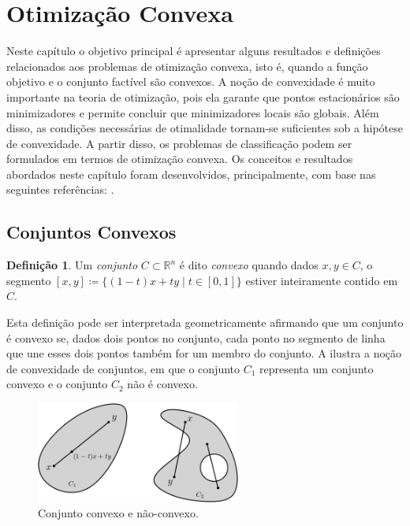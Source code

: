 \documentclass[12pt,a4paper]{scrartcl}
\def\RR{\mathds{R}}
\theoremstyle{definition}%
\newtheorem{defi}{Definição}
\begin{document}

\newpage

\section{Otimização Convexa} \label{chap:otimizacao_convexa}

Neste capítulo o objetivo principal é apresentar alguns resultados e definições relacionados aos problemas de otimização convexa, isto é, quando a função objetivo e o conjunto factível são convexos. A noção de convexidade é muito importante na teoria de otimização, pois ela garante que pontos estacionários são minimizadores e permite concluir que minimizadores locais são globais. Além disso, as condições necessárias de otimalidade tornam-se suficientes sob a hipótese de convexidade. A partir disso, os problemas de classificação podem ser formulados em termos de otimização convexa. Os conceitos e resultados abordados neste capítulo foram desenvolvidos, principalmente, com base nas seguintes referências: \textcite{Evelin2017,Ademir2013,Izmailov2014ac}.

\subsection{Conjuntos Convexos}

\begin{defi} 
Um \emph{conjunto} $C \subset \RR^{n}$ é dito \emph{convexo} quando dados $x,y \in C$, o segmento $[x,y] \coloneqq \{ (1-t)x + ty \mid t\in [0,1] \}$ estiver inteiramente contido em $C$.
\end{defi}

Esta definição pode ser interpretada geometricamente afirmando que um conjunto é convexo se, dados dois pontos no conjunto, cada ponto no segmento de linha que une esses dois pontos também for um membro do conjunto. A  ilustra a noção de convexidade de conjuntos, em que o conjunto $C_{1}$ representa um conjunto convexo e o conjunto $C_{2}$ não é convexo.


\begin{figure}[!ht] 
	\centering
	\includegraphics[width=0.60\textwidth]{conjuntos_convexo_naoconvexo}
	\caption{ Conjunto convexo e não-convexo. \label{fig:conjuntos_convexos}}
\end{figure}
\end{document}
